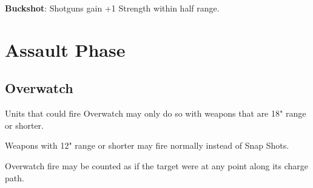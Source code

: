 \documentclass[letterpaper,twocolumn,oneside,titlepage]{book}
\begin{document}
\textbf{Buckshot}: Shotguns gain +1 Strength within half range.

\section{\texorpdfstring{\textbf{Assault
Phase}}{Assault Phase}}\label{assault-phase-1}

\subsection{\texorpdfstring{\textbf{Overwatch}}{Overwatch}}\label{overwatch}

Units that could fire Overwatch may only do so with weapons that are 18" range or shorter.

Weapons with 12" range or shorter may fire normally instead of Snap Shots.

Overwatch fire may be counted as if the target were at any point along its charge path.

\backmatter
\end{document}
